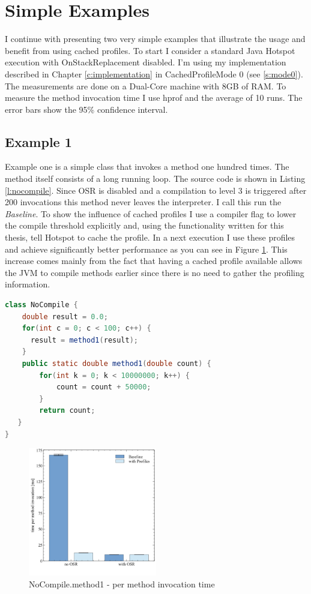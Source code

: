 

\section{Simple Examples}

I continue with presenting two very simple examples that illustrate the usage and benefit from using cached profiles. To start I consider a standard Java Hotspot execution with OnStackReplacement disabled. I'm using my implementation described in Chapter \ref{c:implementation} in CachedProfileMode 0 (see \ref{s:mode0}).
The measurements are done on a Dual-Core machine with 8GB of RAM. To measure the method invocation time I use hprof and the average of 10 runs. The error bars show the 95\% confidence interval.
\subsection{Example 1}
\label{s:ex1}
Example one is a simple class that invokes a method one hundred times. The method itself consists of a long running loop. The source code is shown in Listing \ref{l:nocompile}.
Since OSR is disabled and a compilation to level 3 is triggered after 200 invocations this method never leaves the interpreter. I call this run the \textit{Baseline}.
To show the influence of cached profiles I use a compiler flag to lower the compile threshold explicitly and, using the functionality written for this thesis, tell Hotspot to cache the profile.
In a next execution I use these profiles and achieve significantly better performance as you can see in Figure \ref{f:nocompile}.
This increase comes mainly from the fact that having a cached profile available allows the JVM to compile methods earlier since there is no need to gather the profiling information.
\begin{lstlisting}[float,caption=Simple method that does not get compiled,label=l:nocompile,language=Java]
class NoCompile {
    double result = 0.0;
    for(int c = 0; c < 100; c++) {
      result = method1(result);
    }
    public static double method1(double count) {
        for(int k = 0; k < 10000000; k++) {
            count = count + 50000;
        }
        return count;
   }
}
\end{lstlisting}
\begin{figure}[ht]
  \begin{center}
    \centering
    \includegraphics[width=0.5\textwidth]{figures/nocompile.png}
    \caption{NoCompile.method1 - per method invocation time}
    \label{f:nocompile}
  \end{center}
\end{figure}
